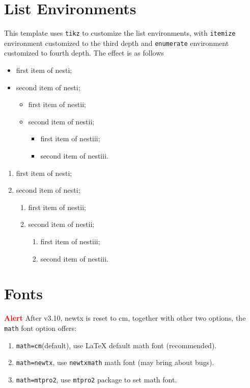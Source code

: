 \documentclass[11pt]{elegantbook}
\begin{document}
\section{List Environments}
This template uses \lstinline{tikz} to customize the list environments, with \lstinline{itemize} environment customized to the third depth and \lstinline{enumerate} environment customized to fourth depth. The effect is as follows\\[2ex]
\begin{minipage}[b]{0.49\textwidth}
\begin{itemize}
   \item first item of nesti;
   \item second item of nesti;
   \begin{itemize}
      \item first item of nestii;
      \item second item of nestii;
      \begin{itemize}
         \item first item of nestiii;
         \item second item of nestiii.
      \end{itemize}   
   \end{itemize}
\end{itemize}
\end{minipage}
\begin{minipage}[b]{0.49\textwidth}
\begin{enumerate}
   \item first item of nesti;
   \item second item of nesti;
   \begin{enumerate}
      \item first item of nestii;
      \item second item of nestii;
      \begin{enumerate}
         \item first item of nestiii;
         \item second item of nestiii.
      \end{enumerate}   
   \end{enumerate}
\end{enumerate}
\end{minipage}


\section{Fonts}
\textcolor{red}{\bfseries Alert} After v3.10, newtx is reset to cm, together with other two options, the \lstinline{math} font option offers:
\begin{enumerate}
  \item \lstinline{math=cm}(default), use \LaTeX{} default math font (recommended).
  \item \lstinline{math=newtx}, use \lstinline{newtxmath} math font (may bring about bugs).
  \item \lstinline{math=mtpro2}, use \lstinline{mtpro2} package to set math font.
\end{enumerate}
\end{document}
